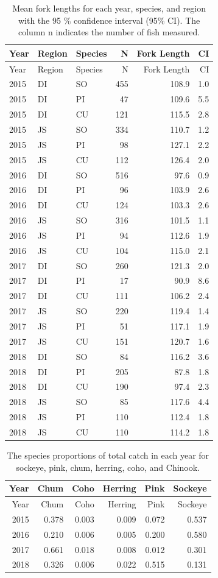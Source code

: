 \documentclass[fleqn,10pt]{wlpeerj} %
\begin{document}
\begin{longtable}[]{@{}lllrrr@{}}
\caption{\label{tab:length-table} Mean fork lengths for each year, species, and region with the 95 \% confidence interval (95\% CI). The column n indicates the number of fish measured.}\tabularnewline
\toprule
Year & Region & Species & N & Fork Length & CI\tabularnewline
\midrule
\endfirsthead
\toprule
Year & Region & Species & N & Fork Length & CI\tabularnewline
\midrule
\endhead
2015 & DI & SO & 455 & 108.9 & 1.0\tabularnewline
2015 & DI & PI & 47 & 109.6 & 5.5\tabularnewline
2015 & DI & CU & 121 & 115.5 & 2.8\tabularnewline
2015 & JS & SO & 334 & 110.7 & 1.2\tabularnewline
2015 & JS & PI & 98 & 127.1 & 2.2\tabularnewline
2015 & JS & CU & 112 & 126.4 & 2.0\tabularnewline
2016 & DI & SO & 516 & 97.6 & 0.9\tabularnewline
2016 & DI & PI & 96 & 103.9 & 2.6\tabularnewline
2016 & DI & CU & 124 & 103.3 & 2.6\tabularnewline
2016 & JS & SO & 316 & 101.5 & 1.1\tabularnewline
2016 & JS & PI & 94 & 112.6 & 1.9\tabularnewline
2016 & JS & CU & 104 & 115.0 & 2.1\tabularnewline
2017 & DI & SO & 260 & 121.3 & 2.0\tabularnewline
2017 & DI & PI & 17 & 90.9 & 8.6\tabularnewline
2017 & DI & CU & 111 & 106.2 & 2.4\tabularnewline
2017 & JS & SO & 220 & 119.4 & 1.4\tabularnewline
2017 & JS & PI & 51 & 117.1 & 1.9\tabularnewline
2017 & JS & CU & 151 & 120.7 & 1.6\tabularnewline
2018 & DI & SO & 84 & 116.2 & 3.6\tabularnewline
2018 & DI & PI & 205 & 87.8 & 1.8\tabularnewline
2018 & DI & CU & 190 & 97.4 & 2.3\tabularnewline
2018 & JS & SO & 85 & 117.6 & 4.4\tabularnewline
2018 & JS & PI & 110 & 112.4 & 1.8\tabularnewline
2018 & JS & CU & 110 & 114.2 & 1.8\tabularnewline
\bottomrule
\end{longtable}

\begin{longtable}[]{@{}rrrrrr@{}}
\caption{\label{tab:proportion-table} The species proportions of total catch in each year for sockeye, pink, chum, herring, coho, and Chinook.}\tabularnewline
\toprule
Year & Chum & Coho & Herring & Pink & Sockeye\tabularnewline
\midrule
\endfirsthead
\toprule
Year & Chum & Coho & Herring & Pink & Sockeye\tabularnewline
\midrule
\endhead
2015 & 0.378 & 0.003 & 0.009 & 0.072 & 0.537\tabularnewline
2016 & 0.210 & 0.006 & 0.005 & 0.200 & 0.580\tabularnewline
2017 & 0.661 & 0.018 & 0.008 & 0.012 & 0.301\tabularnewline
2018 & 0.326 & 0.006 & 0.022 & 0.515 & 0.131\tabularnewline
\bottomrule
\end{longtable}
\end{document}
